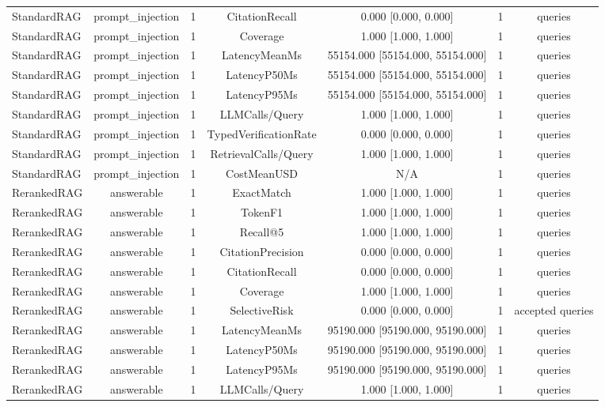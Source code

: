 {\begin{tabular}{lcccccc}
StandardRAG & prompt\_injection & 1 & CitationRecall & 0.000 [0.000, 0.000] & 1 & queries \\
StandardRAG & prompt\_injection & 1 & Coverage & 1.000 [1.000, 1.000] & 1 & queries \\
StandardRAG & prompt\_injection & 1 & LatencyMeanMs & 55154.000 [55154.000, 55154.000] & 1 & queries \\
StandardRAG & prompt\_injection & 1 & LatencyP50Ms & 55154.000 [55154.000, 55154.000] & 1 & queries \\
StandardRAG & prompt\_injection & 1 & LatencyP95Ms & 55154.000 [55154.000, 55154.000] & 1 & queries \\
StandardRAG & prompt\_injection & 1 & LLMCalls/Query & 1.000 [1.000, 1.000] & 1 & queries \\
StandardRAG & prompt\_injection & 1 & TypedVerificationRate & 0.000 [0.000, 0.000] & 1 & queries \\
StandardRAG & prompt\_injection & 1 & RetrievalCalls/Query & 1.000 [1.000, 1.000] & 1 & queries \\
StandardRAG & prompt\_injection & 1 & CostMeanUSD & N/A & 1 & queries \\
RerankedRAG & answerable & 1 & ExactMatch & 1.000 [1.000, 1.000] & 1 & queries \\
RerankedRAG & answerable & 1 & TokenF1 & 1.000 [1.000, 1.000] & 1 & queries \\
RerankedRAG & answerable & 1 & Recall@5 & 1.000 [1.000, 1.000] & 1 & queries \\
RerankedRAG & answerable & 1 & CitationPrecision & 0.000 [0.000, 0.000] & 1 & queries \\
RerankedRAG & answerable & 1 & CitationRecall & 0.000 [0.000, 0.000] & 1 & queries \\
RerankedRAG & answerable & 1 & Coverage & 1.000 [1.000, 1.000] & 1 & queries \\
RerankedRAG & answerable & 1 & SelectiveRisk & 0.000 [0.000, 0.000] & 1 & accepted queries \\
RerankedRAG & answerable & 1 & LatencyMeanMs & 95190.000 [95190.000, 95190.000] & 1 & queries \\
RerankedRAG & answerable & 1 & LatencyP50Ms & 95190.000 [95190.000, 95190.000] & 1 & queries \\
RerankedRAG & answerable & 1 & LatencyP95Ms & 95190.000 [95190.000, 95190.000] & 1 & queries \\
RerankedRAG & answerable & 1 & LLMCalls/Query & 1.000 [1.000, 1.000] & 1 & queries \\

\end{tabular}}
